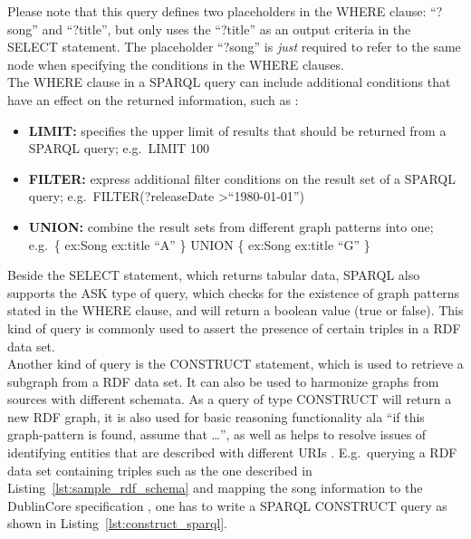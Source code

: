 
Please note that this query defines two placeholders in the WHERE clause: ``?song'' and ``?title'', but only uses the ``?title'' as an output criteria in the SELECT statement. The placeholder ``?song'' is \emph{just} required to refer to the same node when specifying the conditions in the WHERE clauses. \\

The WHERE clause in a \gls{SPARQL} query can include additional conditions that have an effect on the returned information, such as \citep[pg. 66-112]{allemang2011semantic}: \@

\begin{itemize}
	\item \textbf{LIMIT:} specifies the upper limit of results that should be returned from a \gls{SPARQL} query; e.g.\ LIMIT 100
	\item \textbf{FILTER:} express additional filter conditions on the result set of a \gls{SPARQL} query; e.g.\ FILTER(?releaseDate \textgreater ``1980-01-01'')
	\item \textbf{UNION:} combine the result sets from different graph patterns into one; e.g.\ \{ ex:Song ex:title ``A'' \} UNION \{ ex:Song ex:title ``G'' \}
\end{itemize}

Beside the SELECT statement, which returns tabular data, \gls{SPARQL} also supports the ASK type of query, which checks for the existence of graph patterns stated in the WHERE clause, and will return a boolean value (true or false). This kind of query is commonly used to assert the presence of certain triples in a \gls{RDF} data set. \\

Another kind of query is the CONSTRUCT statement, which is used to retrieve a subgraph from a \gls{RDF} data set. It can also be used to harmonize graphs from sources with different schemata. As a query of type CONSTRUCT will return a new \gls{RDF} graph, it is also used for basic reasoning functionality ala ``if this graph-pattern is found, assume that \ldots'', as well as helps to resolve issues of identifying entities that are described with different \gls{URI}s \citep[pg. 88-98]{allemang2011semantic}.
E.g.\ querying a \gls{RDF} data set containing triples such as the one described in Listing~\ref{lst:sample_rdf_schema} and mapping the song information to the DublinCore specification \citep{DublinCore}, one has to write a \gls{SPARQL} CONSTRUCT query as shown in Listing~\ref{lst:construct_sparql}. \@

